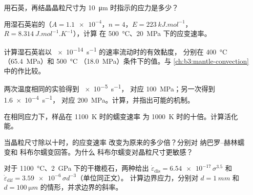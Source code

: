 \begin{exercise}[$\star$]\label{exo:b3:deformation-mechanisms:3}
用石英，再结晶晶粒尺寸为
\qty{10}{\micro m} 时指示的应力是多少？
\end{exercise}

\begin{exercise}[$\star$]\label{exo:b3:deformation-mechanisms:4}
用湿石英岩的（$A = \num{1.1e-4}$，$n = 4$，$E =
\qty{223}{kJ.mol^{-1}}$，$R = \qty{8.314}{J.mol^{-1}.K^{-1}}$），计算
在 \qty{500}{\celsius}、\qty{20}{MPa} 下的应变速率。
\end{exercise}

\begin{exercise}[$\star\star$]\label{exo:b3:deformation-mechanisms:5}
计算湿石英岩以 \qty{e-14}{s^{-1}} 的速率流动时的有效黏度，
分别在 \qty{400}{\celsius}（\qty{65.4}{MPa}）和 \qty{500}{\celsius}
（\qty{18.0}{MPa}）条件下的值。与
\cref{ch:b3:mantle-convection}中的作比较。
\end{exercise}

\begin{exercise}[$\star\star$]\label{exo:b3:deformation-mechanisms:6}
两次温度相同的实验得到 \qty{e-5}{s^{-1}}，
对应 \qty{100}{MPa}；另一次得到 \qty{1.6e-4}{s^{-1}}，
对应 \qty{200}{MPa}。计算，并指出可能的机制。
\end{exercise}

\begin{exercise}[$\star\star$]\label{exo:b3:deformation-mechanisms:7}
在相同应力下，样品在 \qty{1100}{K} 时的蠕变速率
为 \qty{1000}{K} 时的十倍。计算活化能。
\end{exercise}

\begin{exercise}[$\star\star$]\label{exo:b3:deformation-mechanisms:8}
当晶粒尺寸除以十时，的应变速率
改变为原来的多少倍？分别对 纳巴罗–赫林蠕变和 科布尔蠕变回答。为什么
科布尔蠕变对晶粒尺寸更敏感？
\end{exercise}

\begin{exercise}[$\star\star$]\label{exo:b3:deformation-mechanisms:9}
对于 \qty{1100}{\celsius}、\qty{2}{GPa} 下的干橄榄石，两种给出
$\dot\varepsilon_{\mathrm{dis}} = \num{6.54e-17}\,\sigma^{3.5}$ 和
$\dot\varepsilon_{\mathrm{dif}} = \num{3.59e-6}\,\sigma d^{-3}$（单位同正文）。
计算边界应力，分别对 $d = \qty{1}{mm}$ 和 $d =
\qty{100}{\micro m}$ 的情形，并求边界的斜率。
\end{exercise}

